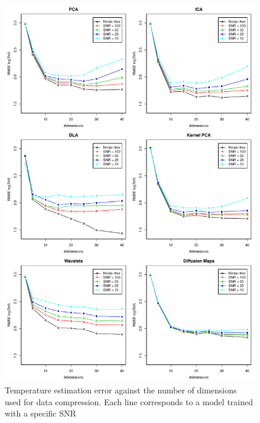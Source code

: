 \documentclass[a4paper,fleqn,usenatbib]{mnras}
\begin{document}
\begin{figure}
\centering\includegraphics[height=0.95\textheight]{flamesHR10_Teff_log_BestSVM_N-SNR-RMSE_test.pdf}
\caption{Temperature estimation error against the number of dimensions
  used for data compression. Each line corresponds to a model trained
  with a specific SNR}
\label{fig:methodsnrTeff}
\end{figure}
\end{document}
